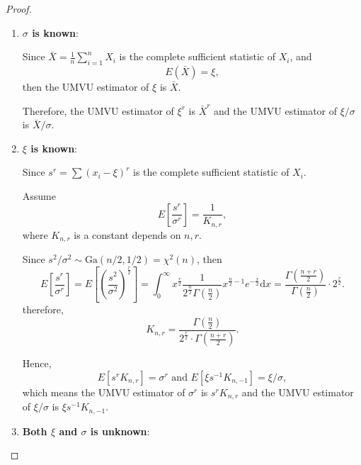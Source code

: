 \begin{proof}
	\begin{enumerate}
		\item \textbf{$\sigma$ is known}:

		      Since $\bar{X}=\frac{1}{n}\sum_{i=1}^{n}X_i$ is the complete sufficient statistic of $X_i$, and
		      \begin{equation*}
			      E(\bar{X})=\xi,
		      \end{equation*}
		      then the UMVU estimator of $\xi$ is $\bar{X}$.

		      Therefore, the UMVU estimator of $\xi^r$ is $\bar{X}^r$ and the UMVU estimator of $\xi/\sigma$ is $\bar{X}/\sigma$.

		\item \textbf{$\xi$ is known}:

		      Since $s^r=\sum\left(x_{i}-\xi\right)^r$ is the complete sufficient statistic of $X_i$.

		      Assume
		      \begin{equation*}
			      E\left[\frac{s^r}{\sigma^r}\right]=\frac{1}{K_{n,r}},
		      \end{equation*}
		      where $K_{n,r}$ is a constant depends on $n,r$.

		      Since $s^2/\sigma^2\sim\text{Ga}(n/2,1/2)=\chi^2(n)$, then
		      \begin{equation*}
			      E\left[\frac{s^r}{\sigma^r}\right]=E\left[\left(\frac{s^2}{\sigma^2}\right)^{\frac{r}{2}}\right]=\int_{0}^{\infty}x^{\frac{r}{2}}\frac{1}{2^{\frac{n}{2}}\Gamma(\frac{n}{2})}x^{\frac{n}{2}-1}e^{-\frac{x}{2}}\mathrm{d}x=\frac{\Gamma\left(\frac{n+r}{2}\right)}{\Gamma(\frac{n}{2})}\cdot 2^{\frac{r}{2}}.
		      \end{equation*}
		      therefore,
		      \begin{equation*}
			      K_{n,r}=\frac{\Gamma(\frac{n}{2})}{2^{\frac{r}{2}}\cdot\Gamma\left(\frac{n+r}{2}\right)}.
		      \end{equation*}

		      Hence,
		      \begin{equation*}
			      E\left[s^rK_{n,r}\right]=\sigma^r \text{ and } E[\xi s^{-1}K_{n,-1}]=\xi/\sigma,
		      \end{equation*}
		      which means the UMVU estimator of $\sigma^r$ is $s^rK_{n,r}$ and the UMVU estimator of $\xi/\sigma$ is $\xi s^{-1}K_{n,-1}$.

		\item \textbf{Both $\xi$ and $\sigma$ is unknown}:


\end{enumerate}
\end{proof}

